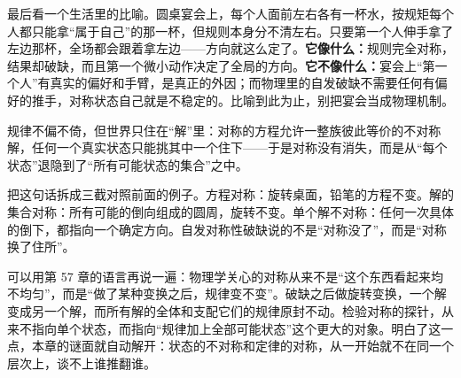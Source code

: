 \begin{mainline}
最后看一个生活里的比喻。圆桌宴会上，每个人面前左右各有一杯水，按规矩每个人都只能拿“属于自己”的那一杯，但规则本身分不清左右。只要第一个人伸手拿了左边那杯，全场都会跟着拿左边——方向就这么定了。\textbf{它像什么：}规则完全对称，结果却破缺，而且第一个微小动作决定了全局的方向。\textbf{它不像什么：}宴会上“第一个人”有真实的偏好和手臂，是真正的外因；而物理里的自发破缺不需要任何有偏好的推手，对称状态自己就是不稳定的。比喻到此为止，别把宴会当成物理机制。
\end{mainline}


\begin{oneline}
规律不偏不倚，但世界只住在“解”里：对称的方程允许一整族彼此等价的不对称解，任何一个真实状态只能挑其中一个住下——于是对称没有消失，而是从“每个状态”退隐到了“所有可能状态的集合”之中。
\end{oneline}

\begin{mainline}
把这句话拆成三截对照前面的例子。方程对称：旋转桌面，铅笔的方程不变。解的集合对称：所有可能的倒向组成的圆周，旋转不变。单个解不对称：任何一次具体的倒下，都指向一个确定方向。自发对称性破缺说的不是“对称没了”，而是“对称换了住所”。

可以用第 57 章的语言再说一遍：物理学关心的对称从来不是“这个东西看起来均不均匀”，而是“做了某种变换之后，规律变不变”。破缺之后做旋转变换，一个解变成另一个解，而所有解的全体和支配它们的规律原封不动。检验对称的探针，从来不指向单个状态，而指向“规律加上全部可能状态”这个更大的对象。明白了这一点，本章的谜面就自动解开：状态的不对称和定律的对称，从一开始就不在同一个层次上，谈不上谁推翻谁。
\end{mainline}


